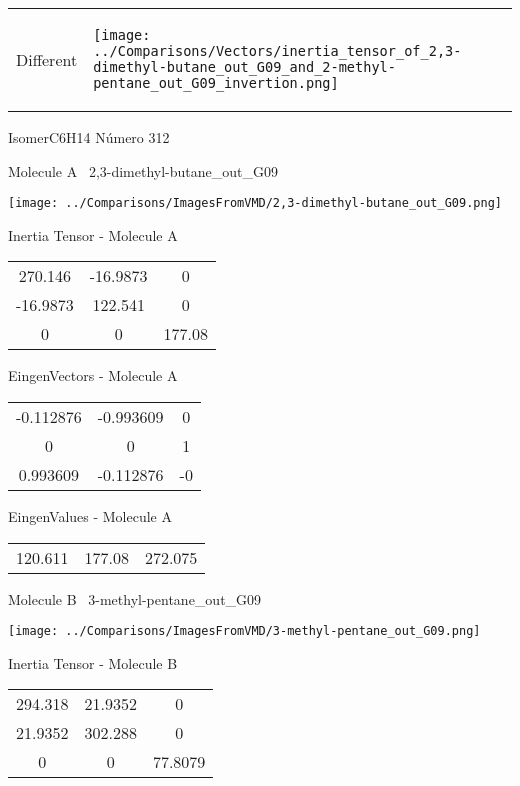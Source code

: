 \vtab[-5mm]
\begin{tabular}{*{2}{m{}}}
\begin{center}
\textcolor{NavyBlue}{\Large Different}
\end{center}
&
\begin{center}
\texttt{[image: ../Comparisons/Vectors/inertia\_tensor\_of\_2,3-dimethyl-butane\_out\_G09\_and\_2-methyl-pentane\_out\_G09\_invertion.png]}
\end{center}
\end{tabular}

 \newpage

\vtab[-3cm]
\begin{center}
{\large IsomerC6H14 \tab Número 312}
\end{center}
\begin{multicols}{2}
\begin{center}

Molecule A \
2,3-dimethyl-butane\_out\_G09

\texttt{[image: ../Comparisons/ImagesFromVMD/2,3-dimethyl-butane\_out\_G09.png]}

Inertia Tensor - Molecule A \\
\begin{tabular}{|c c c|}
270.146	 & 	-16.9873	 & 	0	 \\
-16.9873	 & 	122.541	 & 	0	 \\
0	 & 	0	 & 	177.08
\end{tabular}

\vtab
 EingenVectors - Molecule A     \\
\begin{tabular}{|c c c|}
-0.112876	 & 	-0.993609	 & 	0	 \\
0	 & 	0	 & 	1	 \\
0.993609	 & 	-0.112876	 & 	-0
\end{tabular}

\vtab
 EingenValues - Molecule A     \\
\begin{tabular}{|c c c|}
120.611	 & 	177.08	 & 	272.075	 \\
\end{tabular}
\columnbreak

Molecule B \
3-methyl-pentane\_out\_G09

\texttt{[image: ../Comparisons/ImagesFromVMD/3-methyl-pentane\_out\_G09.png]}

Inertia Tensor - Molecule B \\
\begin{tabular}{|c c c|}
294.318	 & 	21.9352	 & 	0	 \\
21.9352	 & 	302.288	 & 	0	 \\
0	 & 	0	 & 	77.8079
\end{tabular}


\end{center}
\end{multicols}
